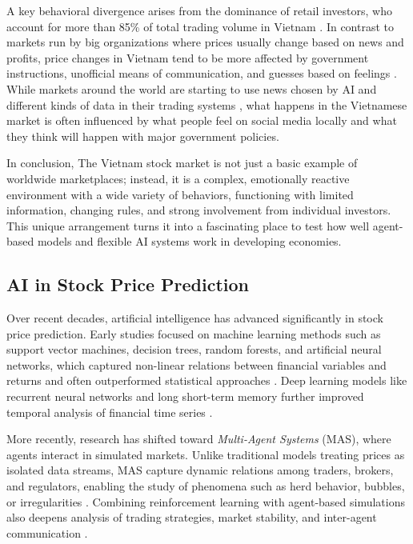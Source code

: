 \documentclass{ieeeaccess}
\begin{document}
A key behavioral divergence arises from the dominance of retail investors, who account for more than 85\% of total trading volume in Vietnam \cite{SSI2024Retail}. In contrast to markets run by big organizations where prices usually change based on news and profits, price changes in Vietnam tend to be more affected by government instructions, unofficial means of communication, and guesses based on feelings \cite{StateBank2023}. While markets around the world are starting to use news chosen by AI and different kinds of data in their trading systems \cite{BloombergAI2023}, what happens in the Vietnamese market is often influenced by what people feel on social media locally and what they think will happen with major government policies.

In conclusion, The Vietnam stock market is not just a basic example of worldwide marketplaces; instead, it is a complex, emotionally reactive environment with a wide variety of behaviors, functioning with limited information, changing rules, and strong involvement from individual investors. This unique arrangement turns it into a fascinating place to test how well agent-based models and flexible AI systems work in developing economies.

\subsection{AI in Stock Price Prediction}

Over recent decades, artificial intelligence has advanced significantly in stock price prediction. Early studies focused on machine learning methods such as support vector machines, decision trees, random forests, and artificial neural networks, which captured non-linear relations between financial variables and returns and often outperformed statistical approaches \cite{kim2003,huang2005,patel2015}. Deep learning models like recurrent neural networks and long short-term memory further improved temporal analysis of financial time series \cite{fischer2018,chen2015}.

More recently, research has shifted toward \textit{Multi-Agent Systems} (MAS), where agents interact in simulated markets. Unlike traditional models treating prices as isolated data streams, MAS capture dynamic relations among traders, brokers, and regulators, enabling the study of phenomena such as herd behavior, bubbles, or irregularities \cite{lebaron2006,chen2012}. Combining reinforcement learning with agent-based simulations also deepens analysis of trading strategies, market stability, and inter-agent communication \cite{tesfatsion2006,wang2021}.
\end{document}
